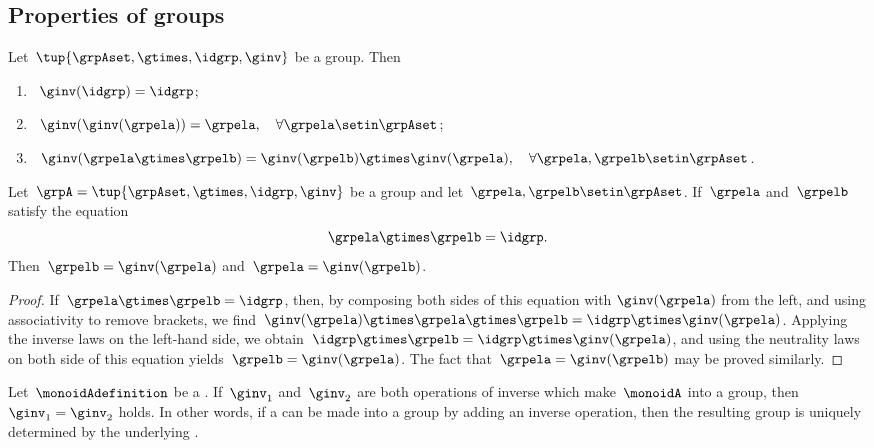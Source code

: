 
\subsection{Properties of groups}

\begin{lemma}
    \label{lem:inv-op-properties}
    Let~$\tup{\grpAset, \gtimes, \idgrp, \ginv}$ be a group.
    Then
    \begin{enumerate}
        \item\label{eq:group-neutral-invariant}~$\ginv(\idgrp) = \idgrp$;
        \item\label{eq:group-inverse-inverse}~$ \ginv(\ginv(\grpela)) = \grpela, \quad \forall \grpela \setin \grpAset$;
        \item\label{eq:group-inverse-of-composition}~$\ginv(\grpela \gtimes \grpelb ) = \ginv(\grpelb) \gtimes \ginv(\grpela), \quad \forall \grpela, \grpelb \setin \grpAset$.
    \end{enumerate}
\end{lemma}

\begin{lemma}
    \label{lem:inv-op-unique}
    Let~$\grpA = \tup{\grpAset, \gtimes, \idgrp, \ginv }$ be a group and let~$\grpela, \grpelb \setin \grpAset$.
    If~$\grpela$ and~$\grpelb$ satisfy the equation
    \begin{equation}
        \grpela \gtimes \grpelb = \idgrp.
    \end{equation}
    Then~$\grpelb = \ginv( \grpela )$ and~$\grpela = \ginv(\grpelb)$.
\end{lemma}

\begin{proof}
    If~$\grpela \gtimes \grpelb = \idgrp$, then, by composing both sides of this equation with $\ginv(\grpela)$ from the left, and using associativity to remove brackets, we find~$\ginv(\grpela) \gtimes \grpela \gtimes \grpelb = \idgrp \gtimes \ginv(\grpela)$.
    Applying the inverse laws on the left-hand side, we obtain~$\idgrp \gtimes \grpelb = \idgrp \gtimes \ginv(\grpela)$, and using the neutrality laws on both side of this equation yields~$\grpelb =  \ginv(\grpela)$.
    The fact that~$\grpela = \ginv(\grpelb)$ may be proved similarly.
\end{proof}

\begin{corollary}
    \label{cor:inv-op-unique}
    Let~$\monoidAdefinition$ be a .
    If~$\ginv_1$ and~$\ginv_2$ are both operations of inverse which make~$\monoidA$ into a group, then~$\ginv_1 =\ginv_2$ holds.
    In other words, if a  can be made into a group by adding an inverse operation, then the resulting group is uniquely determined by the underlying .
\end{corollary}

